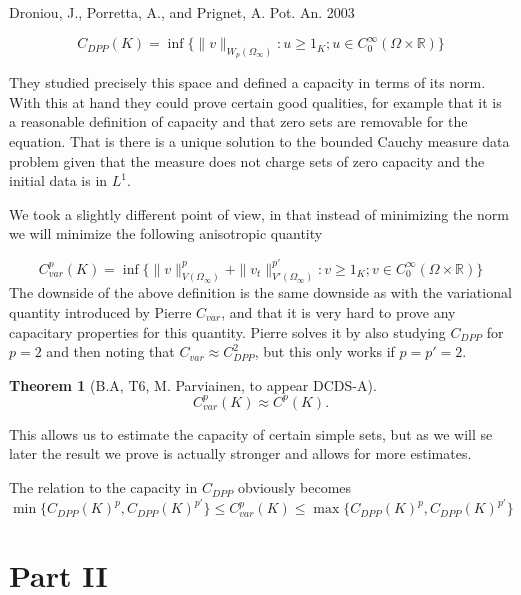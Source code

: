 \documentclass[reqno,a4paper,12pt]{amsart}
\newtheorem{theorem}{Theorem}[section]
\theoremstyle{definition}
\numberwithin{theorem}{section} \numberwithin{equation}{section}
\newcommand{\R}{{\mathbb R}}
\begin{document}
\cite{DPP} Droniou, J., Porretta, A., and Prignet, A. Pot. An. 2003

\begin{equation} \nonumber \label{}
	C_{DPP}(K) = \inf \{ \|v\|_{W_p(\Omega_\infty)}: u \geq 1_K; u \in C_0^\infty(\Omega \times \R) \}
\end{equation}

They studied precisely this space and defined a capacity in terms of its norm. With this at hand they could prove certain good qualities, for example that it is a reasonable definition of capacity and that zero sets are removable for the equation. That is there is a unique solution to the bounded Cauchy measure data problem given that the measure does not charge sets of zero capacity and the initial data is in $L^1$.

We took a slightly different point of view, in that instead of minimizing the norm we will minimize the following anisotropic quantity

\begin{equation} \nonumber \label{}
	C^p_{var}(K) = \inf \{ \|v\|^{p}_{V(\Omega_\infty)} + \|v_t\|^{p'}_{V'(\Omega_\infty)}: v \geq 1_K; v \in C_0^\infty(\Omega \times \R) \}
\end{equation}
The downside of the above definition is the same downside as with the variational quantity introduced by Pierre $C_{var}$, and that it is very hard to prove any capacitary properties for this quantity. Pierre solves it by also studying $C_{DPP}$ for $p=2$ and then noting that $C_{var} \approx C_{DPP}^2$, but this only works if $p=p'=2$.

\begin{theorem}[B.A, T6, M. Parviainen, to appear DCDS-A]
	\begin{equation} \nonumber \label{}
		C^p_{var}(K) \approx C^p(K).
	\end{equation}
\end{theorem}

This allows us to estimate the capacity of certain simple sets, but as we will se later the result we prove is actually stronger and allows for more estimates.

The relation to the capacity in $C_{DPP}$ obviously becomes
\begin{equation} \nonumber \label{}
	\min\{C_{DPP}(K)^p,C_{DPP}(K)^{p'}\} \leq C^p_{var}(K) \leq \max\{C_{DPP}(K)^p,C_{DPP}(K)^{p'}\}
\end{equation}

\section{Part II}
\end{document}

